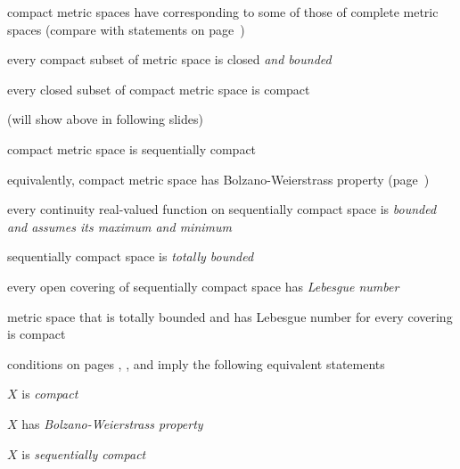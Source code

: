 \documentclass[17pt,landscape]{foils}
\begin{document}
{{	\vitem compact metric spaces have corresponding to some of those of complete metric spaces
	(compare with statements on page~\pageref{page:subspaces})
	\bit
		\item every compact subset of metric space is closed \emph{and bounded}
		\item every closed subset of compact metric space is compact
	\eit

	\vitem (will show above in following slides)
\eit



\bit
	\item compact metric space is sequentially compact 

	\vitem equivalently, compact metric space has Bolzano-Weierstrass property
		(page~\pageref{page:bolzano-weierstrass-property-and-sequential-compactness})
\eit



\bit
	\item every continuity real-valued function on sequentially compact space
		is \emph{bounded and assumes its maximum and minimum}

	\vitem sequentially compact space is \emph{totally bounded}

	\vitem every open covering of sequentially compact space
		has \emph{Lebesgue number}
\eit



\bit
	\item metric space that is totally bounded and has Lebesgue number for every covering
		is compact
\eit



\bit
	\item conditions on
		pages \pageref{page:Necessary-condition-for-compactness},
		\pageref{page:sequentially-compact-metric-spaces-facts},
		and
		\pageref{page:Sufficient-conditions-for-compactness}
		imply the following equivalent statements
	\bit
		\item $X$ is \emph{compact}
		\item $X$ has \emph{Bolzano-Weierstrass property}
		\item $X$ is \emph{sequentially compact}
	\eit

}}
\end{document}
